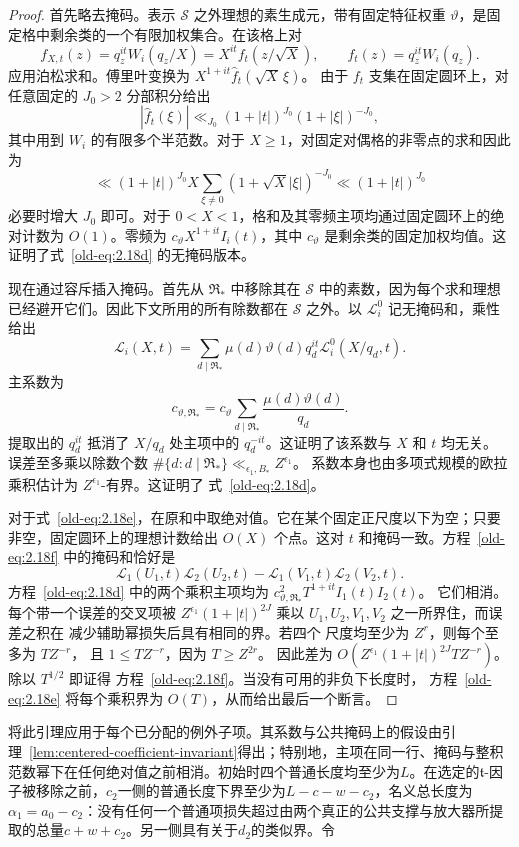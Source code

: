 \documentclass[11pt,a4paper]{article}
\numberwithin{equation}{section}
\numberwithin{figure}{section}
\theoremstyle{definition}
\theoremstyle{remark}
\begin{document}
\begin{proof}
首先略去掩码。表示 \(\mathcal S\) 之外理想的素生成元，带有固定特征权重
\(\vartheta\)，是固定格中剩余类的一个有限加权集合。在该格上对
\[
 f_{X,t}(z)=q_z^{it}W_i(q_z/X)
           =X^{it}f_t(z/\sqrt X),\qquad
 f_t(z)=q_z^{it}W_i(q_z).
\]
应用泊松求和。傅里叶变换为
\(X^{1+it}\widehat f_t(\sqrt X\,\xi)\)。
由于 \(f_t\) 支集在固定圆环上，对任意固定的 \(J_0>2\) 分部积分给出
\[
 |\widehat f_t(\xi)|
 \ll_{J_0} (1+|t|)^{J_0}(1+|\xi|)^{-J_0},
\]
其中用到 \(W_i\) 的有限多个半范数。对于 \(X\ge1\)，对固定对偶格的非零点的求和因此为
\[
 \ll (1+|t|)^{J_0} X
       \sum_{\xi\ne0}(1+\sqrt X|\xi|)^{-J_0}
 \ll (1+|t|)^{J_0}
\]
必要时增大 \(J_0\) 即可。对于 \(0<X<1\)，格和及其零频主项均通过固定圆环上的绝对计数为 \(O(1)\)。零频为
\(c_\vartheta X^{1+it}I_i(t)\)，其中 \(c_\vartheta\) 是剩余类的固定加权均值。这证明了式~\eqref{old-eq:2.18d} 的无掩码版本。

现在通过容斥插入掩码。首先从
\(\mathfrak R_*\) 中移除其在 \(\mathcal S\) 中的素数，因为每个求和理想已经避开它们。因此下文所用的所有除数都在 \(\mathcal S\) 之外。以 \(\mathcal L_i^0\) 记无掩码和，乘性给出
\[
 \mathcal L_i(X,t)
 =\sum_{d\mid\mathfrak R_*}
       \mu(d)\vartheta(d)q_d^{it}\mathcal L_i^0(X/q_d,t).
\]
主系数为
\[
 c_{\vartheta,\mathfrak R_*}
 =c_\vartheta\sum_{d\mid\mathfrak R_*}
             \frac{\mu(d)\vartheta(d)}{q_d}.
\]
提取出的 \(q_d^{it}\) 抵消了 \(X/q_d\) 处主项中的
\(q_d^{-it}\)。这证明了该系数与 \(X\) 和 \(t\) 均无关。
误差至多乘以除数个数
\(\#\{d:d\mid\mathfrak R_*\}\ll_{\epsilon_1,B_*}Z^{\epsilon_1}\)。
系数本身也由多项式规模的欧拉乘积估计为 \(Z^{\epsilon_1}\)-有界。这证明了
式~\eqref{old-eq:2.18d}。

对于式~\eqref{old-eq:2.18e}，在原和中取绝对值。它在某个固定正尺度以下为空；只要非空，固定圆环上的理想计数给出 \(O(X)\)
个点。这对 \(t\) 和掩码一致。方程~\eqref{old-eq:2.18f} 中的掩码和恰好是
\[
 \mathcal L_1(U_1,t)\mathcal L_2(U_2,t)
 -\mathcal L_1(V_1,t)\mathcal L_2(V_2,t).
\]
方程~\eqref{old-eq:2.18d} 中的两个乘积主项均为
\(c_{\vartheta,\mathfrak R_*}^2T^{1+it}I_1(t)I_2(t)\)。
它们相消。每个带一个误差的交叉项被
\(Z^{\epsilon_1}(1+|t|)^{2J}\) 乘以
\(U_1,U_2,V_1,V_2\) 之一所界住，而误差之积在
减少辅助幂损失后具有相同的界。若四个
尺度均至少为 \(Z^r\)，则每个至多为 \(TZ^{-r}\)，
且 \(1\le TZ^{-r}\)，因为 \(T\ge Z^{2r}\)。
因此差为
\(O(Z^{\epsilon_1}(1+|t|)^{2J}TZ^{-r})\)。
除以 \(T^{1/2}\) 即证得
方程~\eqref{old-eq:2.18f}。当没有可用的非负下长度时，
方程~\eqref{old-eq:2.18e} 将每个乘积界为 \(O(T)\)，从而给出最后一个断言。
\end{proof}将此引理应用于每个已分配的例外子项。其系数与公共掩码上的假设由引理~\ref{lem:centered-coefficient-invariant}得出；特别地，主项在同一行、掩码与整积范数幂下在任何绝对值之前相消。初始时四个普通长度均至少为\(L\)。在选定的\(\mathfrak t\)-因子被移除之前，\(c_2\)一侧的普通长度下界至少为\(L-c-w-c_2\)，名义总长度为\(\alpha_1=a_0-c_2\)：没有任何一个普通项损失超过由两个真正的公共支撑与放大器所提取的总量\(c+w+c_2\)。另一侧具有关于\(d_2\)的类似界。令
\end{document}

